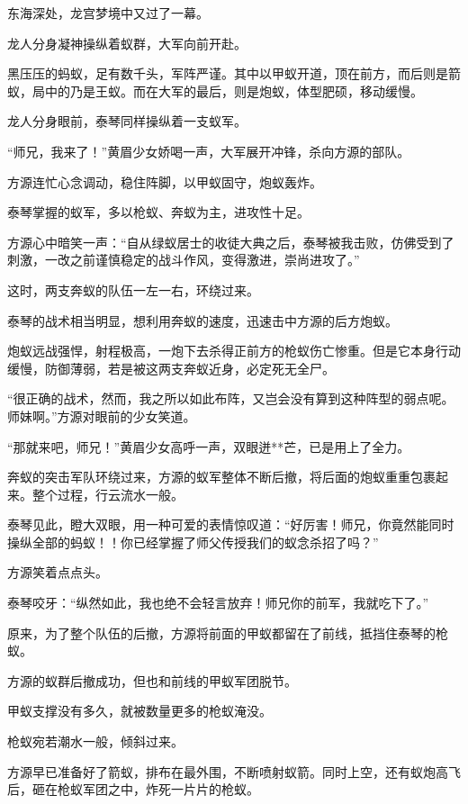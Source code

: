 
\begin{this_body}

东海深处，龙宫梦境中又过了一幕。

龙人分身凝神操纵着蚁群，大军向前开赴。

黑压压的蚂蚁，足有数千头，军阵严谨。其中以甲蚁开道，顶在前方，而后则是箭蚁，局中的乃是王蚁。而在大军的最后，则是炮蚁，体型肥硕，移动缓慢。

龙人分身眼前，泰琴同样操纵着一支蚁军。

“师兄，我来了！”黄眉少女娇喝一声，大军展开冲锋，杀向方源的部队。

方源连忙心念调动，稳住阵脚，以甲蚁固守，炮蚁轰炸。

泰琴掌握的蚁军，多以枪蚁、奔蚁为主，进攻性十足。

方源心中暗笑一声：“自从绿蚁居士的收徒大典之后，泰琴被我击败，仿佛受到了刺激，一改之前谨慎稳定的战斗作风，变得激进，崇尚进攻了。”

这时，两支奔蚁的队伍一左一右，环绕过来。

泰琴的战术相当明显，想利用奔蚁的速度，迅速击中方源的后方炮蚁。

炮蚁远战强悍，射程极高，一炮下去杀得正前方的枪蚁伤亡惨重。但是它本身行动缓慢，防御薄弱，若是被这两支奔蚁近身，必定死无全尸。

“很正确的战术，然而，我之所以如此布阵，又岂会没有算到这种阵型的弱点呢。师妹啊。”方源对眼前的少女笑道。

“那就来吧，师兄！”黄眉少女高呼一声，双眼迸**芒，已是用上了全力。

奔蚁的突击军队环绕过来，方源的蚁军整体不断后撤，将后面的炮蚁重重包裹起来。整个过程，行云流水一般。

泰琴见此，瞪大双眼，用一种可爱的表情惊叹道：“好厉害！师兄，你竟然能同时操纵全部的蚂蚁！！你已经掌握了师父传授我们的蚁念杀招了吗？”

方源笑着点点头。

泰琴咬牙：“纵然如此，我也绝不会轻言放弃！师兄你的前军，我就吃下了。”

原来，为了整个队伍的后撤，方源将前面的甲蚁都留在了前线，抵挡住泰琴的枪蚁。

方源的蚁群后撤成功，但也和前线的甲蚁军团脱节。

甲蚁支撑没有多久，就被数量更多的枪蚁淹没。

枪蚁宛若潮水一般，倾斜过来。

方源早已准备好了箭蚁，排布在最外围，不断喷射蚁箭。同时上空，还有蚁炮高飞后，砸在枪蚁军团之中，炸死一片片的枪蚁。


\end{this_body}
